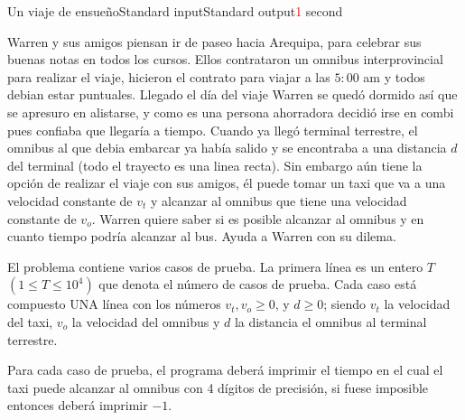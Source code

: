 \begin{problem}{Un viaje de ensue\~no}{Standard input}{Standard output}{\textcolor{red}{1} second}{}

       
Warren y sus amigos piensan ir de paseo hacia Arequipa, para celebrar sus buenas notas en todos los cursos.
Ellos contrataron un omnibus interprovincial para realizar el viaje, hicieron el contrato para viajar a las $5:00$ am y todos debian estar
puntuales. Llegado el día del viaje Warren se quedó dormido así que se apresuro en alistarse, y como es una persona ahorradora
decidió irse en combi pues confiaba que llegaría a tiempo. Cuando ya llegó terminal terrestre, el omnibus al que debia embarcar ya había salido y se encontraba a una distancia $d$ del terminal (todo el trayecto es una linea recta).
Sin embargo aún tiene la opción de realizar el viaje con sus amigos, él puede tomar un taxi que va a una velocidad constante de $v_t$ y alcanzar al omnibus que tiene una velocidad constante de
$v_o$. Warren quiere saber si es posible alcanzar al omnibus y en cuanto tiempo podría alcanzar al bus. Ayuda a Warren con su dilema.


\InputFile
El problema contiene varios casos de prueba. La primera l\'inea es un entero $T$ $(1\leq T \leq 10^4)$ que denota el número de casos de prueba. Cada caso está compuesto UNA l\'inea con los números $v_t,v_o \geq 0$, y $d \geq 0$; siendo $v_t$ la velocidad del taxi, $v_o$ la velocidad del omnibus y $d$ la distancia el omnibus al terminal terrestre.

\OutputFile
Para cada caso de prueba, el programa deber\'a imprimir el tiempo en el cual el taxi puede alcanzar al omnibus con 4 dígitos de precisión, si fuese imposible entonces deber\'a imprimir $-1$.

\Example

\begin{example}
\end{example}

\end{problem}
